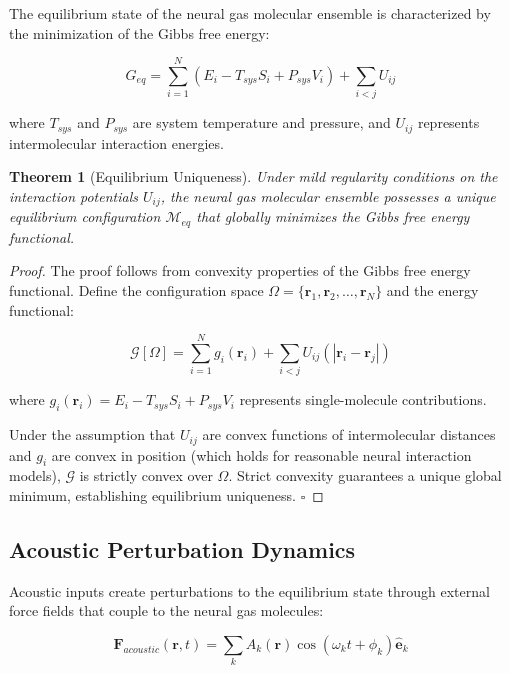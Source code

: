 \documentclass[12pt,a4paper]{article}
\newtheorem{theorem}{Theorem}[section]
\begin{document}
The equilibrium state of the neural gas molecular ensemble is characterized by the minimization of the Gibbs free energy:

\begin{equation}
G_{eq} = \sum_{i=1}^{N} (E_i - T_{sys}S_i + P_{sys}V_i) + \sum_{i<j} U_{ij}
\end{equation}

where $T_{sys}$ and $P_{sys}$ are system temperature and pressure, and $U_{ij}$ represents intermolecular interaction energies.

\begin{theorem}[Equilibrium Uniqueness]
Under mild regularity conditions on the interaction potentials $U_{ij}$, the neural gas molecular ensemble possesses a unique equilibrium configuration $\mathcal{M}_{eq}$ that globally minimizes the Gibbs free energy functional.
\end{theorem}

\begin{proof}
The proof follows from convexity properties of the Gibbs free energy functional. Define the configuration space $\Omega = \{\mathbf{r}_1, \mathbf{r}_2, \ldots, \mathbf{r}_N\}$ and the energy functional:

\begin{equation}
\mathcal{G}[\Omega] = \sum_{i=1}^{N} g_i(\mathbf{r}_i) + \sum_{i<j} U_{ij}(|\mathbf{r}_i - \mathbf{r}_j|)
\end{equation}

where $g_i(\mathbf{r}_i) = E_i - T_{sys}S_i + P_{sys}V_i$ represents single-molecule contributions.

Under the assumption that $U_{ij}$ are convex functions of intermolecular distances and $g_i$ are convex in position (which holds for reasonable neural interaction models), $\mathcal{G}$ is strictly convex over $\Omega$. Strict convexity guarantees a unique global minimum, establishing equilibrium uniqueness. $\square$
\end{proof}

\subsection{Acoustic Perturbation Dynamics}

Acoustic inputs create perturbations to the equilibrium state through external force fields that couple to the neural gas molecules:

\begin{equation}
\mathbf{F}_{acoustic}(\mathbf{r}, t) = \sum_{k} A_k(\mathbf{r}) \cos(\omega_k t + \phi_k) \hat{\mathbf{e}}_k
\end{equation}
\end{document}
